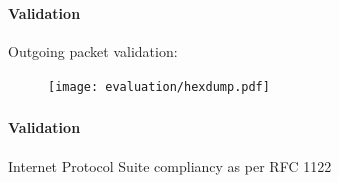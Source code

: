 \begin{frame}%
    \frametitle{\EvaluationTitle}
    \framesubtitle{Validation}
    Outgoing packet validation:
    \begin{figure}
        \centering
        \texttt{[image: evaluation/hexdump.pdf]}
    \end{figure}

\end{frame}

\begin{frame}%
    \frametitle{\EvaluationTitle}
    \framesubtitle{Validation}
    Internet Protocol Suite compliancy as per RFC 1122
\end{frame}
